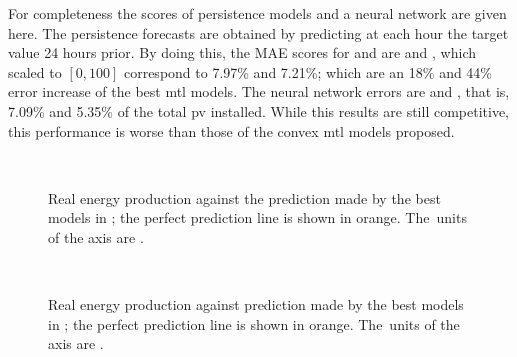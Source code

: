 %
For completeness the scores of persistence models and a neural network are given here.
The persistence forecasts are obtained by predicting at each hour the target value 24 hours prior. By doing this, the MAE scores for  and  are  and , which scaled to $[0, 100]$ correspond to 7.97\% and 7.21\%; which are an 18\% and 44\% error increase of the best \acrshort{mtl} models.
The neural network errors are  and , that is, 7.09\% and 5.35\% of the total \acrshort{pv} installed. While this results are still competitive, this performance is worse than those of the convex \acrshort{mtl} models proposed.


\begin{figure}[t!]
    \centering%
    \quad%
    \quad%
    \\
 \caption{\label{fig:majorca_best_plots} Real energy production against the prediction made by the best  models {in} ; the perfect prediction line is shown in orange. The~units of the axis are \mwhu{}.}
\end{figure}

\begin{figure}[t!]
    \centering%
    \quad%
    \quad%
    \\
 \caption{\label{fig:tenerife_best_plots} Real energy production against prediction made by the best models {in} ; the perfect prediction  line is shown in orange. The~units of the axis are \mwhu{}.}
\end{figure}


